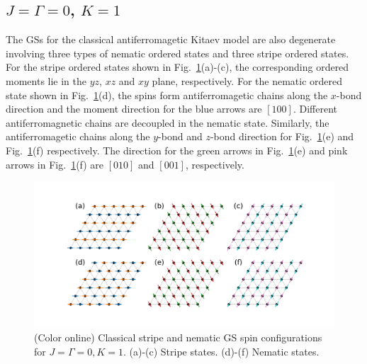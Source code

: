 \documentclass[aps,prb,reprint,amsfonts,amsmath,amssymb,showpacs,groupedaddress,superscriptaddress]{revtex4-1}
\begin{document}
\subsection{$J=\Gamma=0$, $K=1$}

The GSs for the classical antiferromagetic Kitaev model are also degenerate involving three types of nematic ordered states and three stripe ordered states. For the stripe ordered states shown in Fig.~\ref{fig:GSForPositiveK}(a)-(c), the corresponding ordered moments lie in the $yz$, $xz$ and $xy$ plane, respectively. For the nematic ordered state shown in Fig.~\ref{fig:GSForPositiveK}(d), the spins form antiferromagetic chains along the $x$-bond direction and the moment direction for the blue arrows are $[100]$. Different antiferromagnetic chains are decoupled in the nematic state. Similarly, the antiferromagetic chains along the $y$-bond and $z$-bond direction for Fig.~\ref{fig:GSForPositiveK}(e) and Fig.~\ref{fig:GSForPositiveK}(f) respectively. The direction for the green arrows in Fig.~\ref{fig:GSForPositiveK}(e) and pink arrows in Fig.~\ref{fig:GSForPositiveK}(f) are $[010]$ and $[001]$, respectively.
\begin{figure}
    \includegraphics[width=\columnwidth]{fig/SpinConfigForPositiveKitaev.pdf}
    \caption{\label{fig:GSForPositiveK}(Color online) Classical stripe and nematic GS spin configurations for $J=\Gamma=0, K=1$. (a)-(c) Stripe states. (d)-(f) Nematic states.}
\end{figure}

\end{document}
